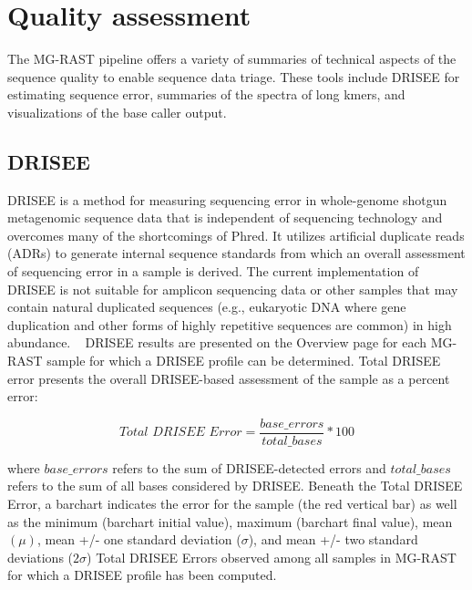 \documentclass[12pt,fullpage]{report}
\begin{document}
\section{Quality assessment}
\label{section:Quality}
The MG-RAST pipeline offers a variety of summaries of technical aspects of the sequence quality to enable sequence data triage.  These tools include DRISEE for estimating sequence error, summaries of the spectra of long kmers, and visualizations of the base caller output.
\subsection{DRISEE}
\label{DRISEEDETAIL}

DRISEE \cite{DRISEE} is a method for measuring sequencing error in whole-genome shotgun metagenomic sequence data that is independent of sequencing technology and overcomes many of the shortcomings of Phred. It utilizes artificial duplicate reads (ADRs) to generate internal sequence standards from which an overall assessment of sequencing error in a sample is derived. 
The current implementation of DRISEE is not suitable for amplicon sequencing data or other samples that may contain natural duplicated sequences (e.g., eukaryotic DNA where gene duplication and other forms of highly repetitive sequences are common) in high abundance.
\
DRISEE results are presented on the Overview page for each MG-RAST sample for which a DRISEE profile can be determined.
Total DRISEE error presents the overall DRISEE-based assessment of the sample as a percent error:

\begin{small}
$$Total \,\, DRISEE \,\, Error = \frac{base\_errors}{total\_bases} * 100$$
\end{small}

\noindent where ${base\_errors}$ refers to the sum of DRISEE-detected errors and ${total\_bases}$ refers to the sum of all bases considered by DRISEE.
Beneath the Total DRISEE Error, a barchart indicates the error for the sample (the red vertical bar) as well as the minimum (barchart initial value), maximum (barchart final value), mean \begin{math}(\mu)\end{math}, mean +/- one standard deviation (\begin{math}\sigma\end{math}), and mean +/- two standard deviations (\begin{math}2\sigma\end{math}) Total DRISEE Errors observed among all samples in MG-RAST for which a DRISEE profile has been computed. 
\end{document}
